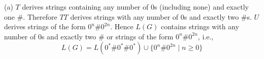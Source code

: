 (a) $T$ derives strings containing any number of $0$s (including none) and
exactly one $\#$.
Therefore $TT$ derives strings with any number of $0$s and exactly two
$\#$s.
$U$ derives strings of the form $0^n \# 0^{2n}$.
Hence $L(G)$ contains strings with any number of $0$s and exactly two
$\#$ or strings of the form $0^n \# 0^{2n}$, i.e.,
\[
L(G) = L(0^* \# 0^* \# 0^*) \cup \{0^n \# 0^{2n} \mid n \geq 0\} 
\]
